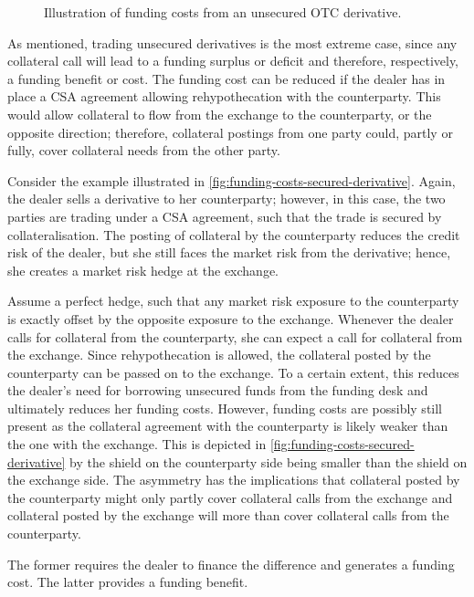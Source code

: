 \documentclass[main.tex]{subfiles}
\begin{document}
        \begin{figure}
            \centering
            \resizebox{\textwidth}{!}{%
            \begin{tikzpicture}
                
            \end{tikzpicture}        
            }   
            \caption{Illustration of funding costs from an unsecured OTC derivative.}
            \label{fig:funding-costs-unsecured-derivative}
        \end{figure}

        As mentioned, trading unsecured derivatives is the most extreme case,
        since any collateral call will lead to a funding surplus or deficit 
        and therefore, respectively, a funding benefit or cost.
        The funding cost can be reduced if the dealer has in place 
        a CSA agreement allowing rehypothecation with the counterparty.
        This would allow collateral to flow from the exchange to the counterparty, 
        or the opposite direction;
        therefore, collateral postings from one party could, partly or fully, 
        cover collateral needs from the other party.

        \begin{example}
        Consider the example illustrated in \cref{fig:funding-costs-secured-derivative}.
        Again, the dealer sells a derivative to her counterparty;
        however, in this case, the two parties are trading under a CSA agreement, 
        such that the trade is secured by collateralisation.
        The posting of collateral by the counterparty reduces the credit risk of the dealer,
        but she still faces the market risk from the derivative;
        hence, she creates a market risk hedge at the exchange.
        
        Assume a perfect hedge, such that any market risk exposure to the counterparty 
        is exactly offset by the opposite exposure to the exchange.
        Whenever the dealer calls for collateral from the counterparty,
        she can expect a call for collateral from the exchange.
        Since rehypothecation is allowed,
        the collateral posted by the counterparty can be passed on to the exchange.
        To a certain extent, this reduces the dealer's need for borrowing unsecured funds from the funding desk
        and ultimately reduces her funding costs.
        However, funding costs are possibly still present as
        the collateral agreement with the counterparty is likely weaker than the one with the exchange. 
        This is depicted in \cref{fig:funding-costs-secured-derivative} 
        by the shield on the counterparty side being smaller than the shield on the exchange side.
        The asymmetry has the implications that 
        collateral posted by the counterparty might only partly cover collateral calls from the exchange 
        and collateral posted by the exchange will more than cover collateral calls from the counterparty.

        The former requires the dealer to finance the difference and generates a funding cost.
        The latter provides a funding benefit.
        \end{example}
\end{document}
